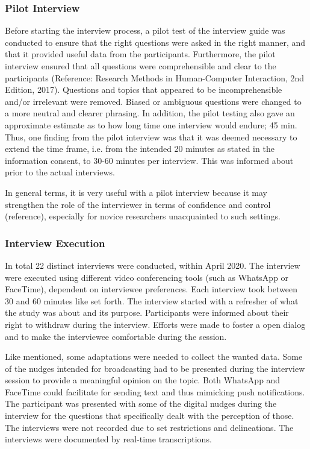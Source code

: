         \subsubsection{Pilot Interview}
        Before starting the interview process, a pilot test of the interview guide was conducted to ensure that the right questions were asked in the right manner, and that it provided useful data from the participants.  Furthermore, the pilot interview ensured that all questions were comprehensible and clear to  the  participants (Reference:  Research Methods in Human-Computer Interaction, 2nd Edition, 2017).  Questions and topics that appeared to be incomprehensible and/or irrelevant were removed. Biased or ambiguous questions were changed to a more neutral and clearer phrasing. In addition, the pilot testing also gave an approximate estimate as to how long time one interview would endure; 45 min. Thus, one finding from the pilot interview was that it was deemed necessary to extend the time frame, i.e. from the intended 20 minutes as stated in the information consent, to 30-60 minutes per interview. This was informed about prior to the actual interviews.
        
        In general terms, it is very useful with a pilot interview because it may strengthen the role of the interviewer in terms of confidence and control (reference), especially for novice researchers unacquainted to such settings. 
        \subsubsection{Interview Execution}
        In total 22 distinct interviews were conducted, within April 2020. The interview were executed using different video conferencing tools (such as WhatsApp or FaceTime), dependent on interviewee preferences. Each interview took between 30 and 60 minutes like set forth. The interview started with a refresher of what the study was about and its purpose. Participants were informed about their right to withdraw during the interview. Efforts were made to foster a open dialog and to make the interviewee comfortable during the session. 
 
        Like mentioned, some adaptations were needed to collect the wanted data. Some of the nudges intended for broadcasting had to be presented during the interview session to provide a meaningful opinion on the topic. Both WhatsApp and FaceTime could facilitate for sending text and thus mimicking push notifications. The participant was presented with some of the digital nudges during the interview for the questions that specifically dealt with the perception of those.
        The interviews were not recorded due to set restrictions and delineations. The interviews were documented by real-time transcriptions. 

